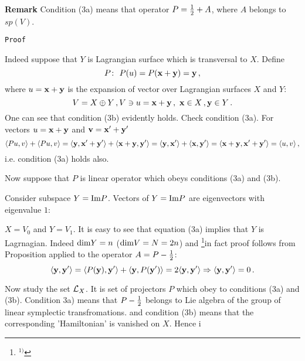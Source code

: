 {\bf Remark}  Condition (3a) means that operator
$P={1\over 2}+A$, where $A$ belongs to $sp(V)$.

\smallskip

{\tt Proof}

Indeed suppose that $Y$ is Lagrangian surface which is
transversal to $X$. Define 
   $$
P\colon\,\, P(u)=P({\bf x}+{\bf y})={\bf y}\,,
   $$
where $u={\bf x}+{\bf y}$  is the expansion of vector over
Lagrangian surfaces $X$ and $Y$:
           $$
V=X\oplus Y\,,V\ni u={\bf x}+{\bf y}\,,\,\, {\bf x}\in  X\,,{\bf y}\in Y\,.
           $$
One can see that condition  (3b) evidently holds.
Check condition (3a).
For vectors $u={\bf x}+{\bf y}$ and ${\bf v}={\bf x}'+{\bf y}'$
      $$
\langle Pu,v\rangle
+
\langle Pu,v\rangle=
\langle {\bf y}, {\bf x}'+{\bf y}'\rangle
       +
\langle {\bf x}+{\bf y},{\bf y}'\rangle=
\langle {\bf y}, {\bf x}'\rangle
       +
\langle {\bf x},{\bf y}'\rangle=
\langle{\bf x}+{\bf y},{\bf x}'+{\bf y}'\rangle
    =
\langle u,v\rangle\,,
      $$ 
i.e.  condition (3a) holds also.

\smallskip

Now suppose that $P$ is linear operator which obeys
conditions (3a) and (3b).


 Consider subspace $Y={\rm Im}P$.
Vectors of  $Y={\rm Im } P$ are eigenvectors with
eigenvalue $1$: 


 $X=V_0$ and $Y=V_1$.
It is easy to see that equation (3a) implies that $Y$ is
Lagrnagian. Indeed ${\rm dim} Y=n$ (${\rm dim} V=N=2n$)
and \footnote{$^{1)}$}{in fact proof follows from Proposition applied
to the  operator $A=P-{1\over 2}$}:
       $$
\langle {\bf y}, {\bf y}'\rangle=
\langle P({\bf y}), {\bf y}'\rangle+
\langle {\bf y}, P({\bf y}')\rangle=
 2\langle {\bf y}, {\bf y}'\rangle\Rightarrow
\langle {\bf y}, {\bf y}'\rangle=0\,.
       $$

\bigskip

Now study the set ${\cal L}_X$.
It is set of projectors $P$ which obey to conditions
(3a) and (3b). Condition 3a) means that  $P-{1\over 2}$
belongs to Lie algebra of the group of linear symplectic
transfromations. and condition (3b) means that
the corresponding 'Hamiltonian' is vanished on $X$.
Hence i
\bye
